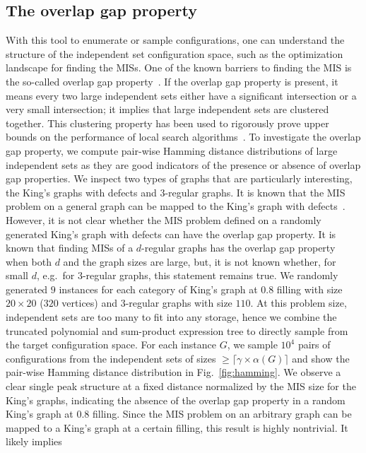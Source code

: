 \documentclass[onefignum, onetabnum]{siamart190516}
\newcommand{\<}{\langle}
\renewcommand{\>}{\rangle}
\newcommand{\Fig}[1]{Fig.~\ref{#1}}
\begin{document}
\subsection{The overlap gap property\label{sec:overlap-gap}}
With this tool to enumerate or sample configurations, one can understand the structure of the independent set configuration space, such as the optimization landscape for finding the MISs.
One of the known barriers to finding the MIS is the so-called overlap gap property~\cite{Gamarnik2013, Gamarnik2019}.
If the overlap gap property is present, it means every two large independent sets either have a significant intersection or a very small intersection;
it implies that large independent sets are clustered together.
This clustering property has been used to rigorously prove upper bounds on the performance of local search algorithms~\cite{Gamarnik2013, Gamarnik2019}.
To investigate the overlap gap property, we compute pair-wise Hamming distance distributions of large independent sets as they are good indicators of the presence or absence of overlap gap properties.
We inspect two types of graphs that are particularly interesting, the King's graphs with defects and $3$-regular graphs.
It is known that the MIS problem on a general graph can be mapped to the King's graph with defects~\cite{Garey1977,Ebadi2022}. However, it is not clear whether the MIS problem defined on a randomly generated King's graph with defects can have the overlap gap property.
It is known that finding MISs of a $d$-regular graphs has the overlap gap property~\cite{Rahman2017,Gamarnik2021} when both $d$ and the graph sizes are large, but, it is not known whether, for small $d$, e.g.\ for $3$-regular graphs, this statement remains true.
We randomly generated $9$ instances for each category of King's graph at $0.8$ filling with size $20\times 20$ ($320$ vertices) and $3$-regular graphs with size $110$.
At this problem size, independent sets are too many to fit into any storage, hence we combine the truncated polynomial and sum-product expression tree to directly sample from the target configuration space.
For each instance $G$, we sample $10^4$ pairs of configurations from the independent sets of sizes $\geq \lceil \gamma \times \alpha(G)\rceil$ and show the pair-wise Hamming distance distribution in \Fig{fig:hamming}.
We observe a clear single peak structure at a fixed distance normalized by the MIS size for the King's graphs, indicating the absence of the overlap gap property in a random King's graph at $0.8$ filling.
Since the MIS problem on an arbitrary graph can be mapped to a King's graph at a certain filling, this result is highly nontrivial. It likely implies 
\end{document}
